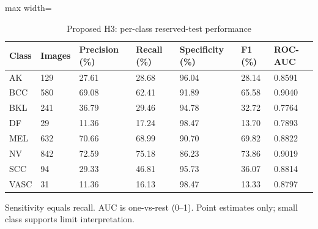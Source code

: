\begin{table}[t]
\centering
\small
\caption{Proposed H3: per-class reserved-test performance}
\label{tab:07-h3-per-class}
\begin{adjustbox}{max width=\textwidth}
\begin{tabular}{lllllll}
\toprule
\textbf{Class} & \textbf{Images} & \textbf{Precision (\%)} & \textbf{Recall (\%)} & \textbf{Specificity (\%)} & \textbf{F1 (\%)} & \textbf{ROC-AUC} \\
\midrule
AK & 129 & 27.61 & 28.68 & 96.04 & 28.14 & 0.8591 \\
BCC & 580 & 69.08 & 62.41 & 91.89 & 65.58 & 0.9040 \\
BKL & 241 & 36.79 & 29.46 & 94.78 & 32.72 & 0.7764 \\
DF & 29 & 11.36 & 17.24 & 98.47 & 13.70 & 0.7893 \\
MEL & 632 & 70.66 & 68.99 & 90.70 & 69.82 & 0.8822 \\
NV & 842 & 72.59 & 75.18 & 86.23 & 73.86 & 0.9019 \\
SCC & 94 & 29.33 & 46.81 & 95.73 & 36.07 & 0.8814 \\
VASC & 31 & 11.36 & 16.13 & 98.47 & 13.33 & 0.8797 \\
\bottomrule
\end{tabular}
\end{adjustbox}
\par\smallskip
\begin{minipage}{\textwidth}\footnotesize Sensitivity equals recall. AUC is one-vs-rest (0--1). Point estimates only; small class supports limit interpretation.\end{minipage}
\end{table}
